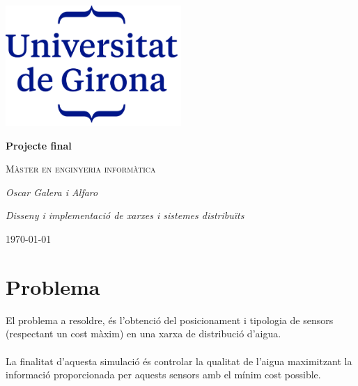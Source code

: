 \documentclass[12pt]{article}
\begin{document}
\begin{titlepage}
		\centering
		\includegraphics[width=0.5\textwidth]{imatges/logo3.png}\par\vspace{1cm}
		{\huge\bfseries Projecte final\par}
		\vspace{1cm}
		{\scshape\Large Màster en enginyeria informàtica\par}
		\vspace{1.5cm}
		{\Large\itshape Oscar Galera i Alfaro\par}
		\vspace{1cm}
		{\Large\itshape Disseny i implementació de xarxes i sistemes distribuïts\par}
		\vspace{2cm}
		\vfill
		\vfill
		{\large \today\par}
\end{titlepage}
\clearpage
\tableofcontents
\clearpage
\listoffigures


\clearpage
\section{Problema\label{problema}}
El problema a resoldre, és l'obtenció del posicionament i tipologia de sensors (respectant un cost màxim) en una xarxa de distribució d'aigua. 
\\\\La finalitat d'aquesta simulació és controlar la qualitat de l'aigua maximitzant la informació proporcionada per aquests sensors amb el mínim cost possible.
\end{document}
